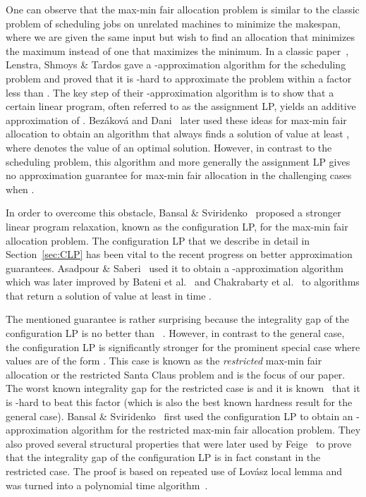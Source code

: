 \documentclass{llncs}
\begin{document}
One can observe that the max-min fair allocation problem is similar to
the classic problem of scheduling jobs on unrelated machines to
minimize the makespan, where we are given the same input but wish to
find an allocation that minimizes the maximum instead of one that
maximizes the minimum. In a classic paper~\cite{LST90}, Lenstra,
Shmoys \& Tardos gave a -approximation algorithm for the scheduling
problem and proved that it is -hard to approximate the
problem within a factor less than . The key step of their
-approximation algorithm is to show that a certain linear program,
often referred to as the assignment LP, yields an additive
approximation of .  Bez\'akov\'a and
Dani~\cite{BD05} later used these ideas for max-min fair allocation to
obtain an algorithm that always finds a solution of value at least
, where  denotes the value of an optimal
solution. However, in contrast to the scheduling problem, this
algorithm and more generally the assignment LP gives no approximation
guarantee for max-min fair allocation in the challenging cases when
.

In order to overcome this obstacle, Bansal \& Sviridenko~\cite{BS06}
proposed a stronger linear program relaxation, known as the
configuration LP, for the max-min fair allocation problem. The
configuration LP that we describe in detail in Section~\ref{sec:CLP}
has been vital to the recent progress on better approximation
guarantees.  Asadpour \& Saberi~\cite{AS07} used it to obtain a
-approximation
algorithm which was later improved by Bateni et al.~\cite{Bateni09}
and Chakrabarty et al.~\cite{Chakrabarty09} to algorithms that return
a solution of value at least  in time
.

The mentioned guarantee  is rather
surprising because the integrality gap of the configuration LP is no
better than ~\cite{BS06}. However, in
contrast to the general case, the configuration LP is significantly
stronger for the prominent special case where values are of the form
. This case is known as the \emph{restricted}
max-min fair allocation or the restricted Santa Claus problem and is the focus of our
paper. The worst known integrality gap for the restricted case is
 and it is known~\cite{BD05} that it is -hard to beat
this factor (which is also the best known hardness result for the
general case).
Bansal \& Sviridenko~\cite{BS06} first used the configuration LP to
obtain an -approximation algorithm for the restricted max-min fair
allocation problem. They also proved several structural properties
that were later used by Feige~\cite{Feige08} to prove that the
integrality gap of the configuration LP is in fact constant in the
restricted case. The proof is based on repeated use of Lov\'{a}sz
local lemma and was turned into a polynomial time algorithm~\cite{HSS10}.
\end{document}
